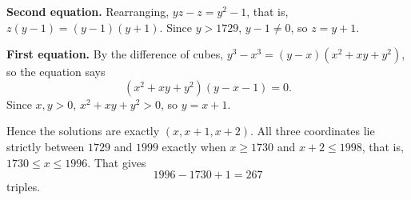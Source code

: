 \textbf{Second equation.} Rearranging, $yz-z=y^2-1$, that is, $z(y-1)=(y-1)(y+1)$. Since $y>1729$, $y-1\ne0$, so $z=y+1$.

\textbf{First equation.} By the difference of cubes, $y^3-x^3=(y-x)\left(x^2+xy+y^2\right)$, so the equation says
\[\left(x^2+xy+y^2\right)(y-x-1)=0 .\]
Since $x,y>0$, $x^2+xy+y^2>0$, so $y=x+1$.

Hence the solutions are exactly $(x,x+1,x+2)$. All three coordinates lie strictly between $1729$ and $1999$ exactly when $x\ge1730$ and $x+2\le1998$, that is, $1730\le x\le1996$. That gives
\[1996-1730+1=\boxed{267}\]
triples.
